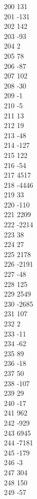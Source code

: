 { 200	131 \\
 201	-131 \\
 202	142 \\
 203	-93 \\
 204	2 \\
 205	78 \\
 206	-87 \\
 207	102 \\
 208	-30 \\
 209	-1 \\
 210	-5 \\
 211	13 \\
 212	19 \\
 213	-48 \\
 214	-127 \\
 215	122 \\
 216	-54 \\
 217	4517 \\
 218	-4446 \\
 219	33 \\
 220	-110 \\
 221	2209 \\
 222	-2214 \\
 223	38 \\
 224	27 \\
 225	2178 \\
 226	-2191 \\
 227	-48 \\
 228	125 \\
 229	2549 \\
 230	-2685 \\
 231	107 \\
 232	2 \\
 233	-11 \\
 234	-62 \\
 235	89 \\
 236	-18 \\
 237	50 \\
 238	-107 \\
 239	29 \\
 240	-17 \\
 241	962 \\
 242	-929 \\
 243	6945 \\
 244	-7181 \\
 245	-179 \\
 246	-3 \\
 247	304 \\
 248	150 \\
 249	-57 \\
}
